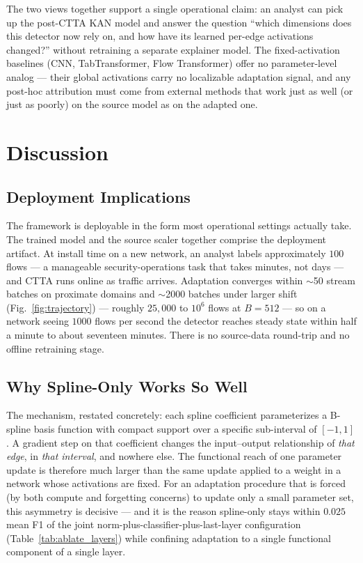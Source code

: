 \documentclass[10pt, conference, letterpaper]{IEEEtran}
\begin{document}
The two views together support a single operational claim: an analyst can pick up the post-CTTA KAN model and answer the question ``which dimensions does this detector now rely on, and how have its learned per-edge activations changed?'' without retraining a separate explainer model. The fixed-activation baselines (CNN, TabTransformer, Flow Transformer) offer no parameter-level analog --- their global activations carry no localizable adaptation signal, and any post-hoc attribution must come from external methods that work just as well (or just as poorly) on the source model as on the adapted one.


\section{Discussion}
\label{sec:discussion}

\subsection{Deployment Implications}

The framework is deployable in the form most operational settings actually take. The trained model and the source scaler together comprise the deployment artifact. At install time on a new network, an analyst labels approximately $100$ flows --- a manageable security-operations task that takes minutes, not days --- and CTTA runs online as traffic arrives. Adaptation converges within $\sim$50 stream batches on proximate domains and $\sim$2000 batches under larger shift (Fig.~\ref{fig:trajectory}) --- roughly $25{,}000$ to $10^6$ flows at $B = 512$ --- so on a network seeing $1000$ flows per second the detector reaches steady state within half a minute to about seventeen minutes. There is no source-data round-trip and no offline retraining stage.

\subsection{Why Spline-Only Works So Well}

The mechanism, restated concretely: each spline coefficient parameterizes a B-spline basis function with compact support over a specific sub-interval of $[-1, 1]$. A gradient step on that coefficient changes the input--output relationship of \emph{that edge}, in \emph{that interval}, and nowhere else. The functional reach of one parameter update is therefore much larger than the same update applied to a weight in a network whose activations are fixed. For an adaptation procedure that is forced (by both compute and forgetting concerns) to update only a small parameter set, this asymmetry is decisive --- and it is the reason spline-only stays within $0.025$ mean F1 of the joint norm-plus-classifier-plus-last-layer configuration (Table~\ref{tab:ablate_layers}) while confining adaptation to a single functional component of a single layer.
\end{document}
